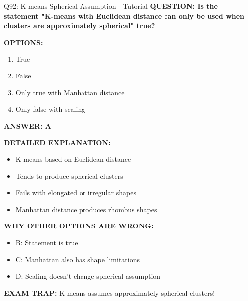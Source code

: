 \documentclass[8pt]{beamer}
\begin{document}
	\begin{frame}{Q92: K-means Spherical Assumption - Tutorial}
		\fontsize{6.5}{7.5}\selectfont
		\textbf{QUESTION: Is the statement "K-means with Euclidean distance can only be used when clusters are approximately spherical" true?}
		
		\vspace{0.1cm}
		\textbf{OPTIONS:}
		\begin{enumerate}
			\item True
			\item False
			\item Only true with Manhattan distance
			\item Only false with scaling
		\end{enumerate}
		
		\vspace{0.1cm}
		\textcolor{myblue}{\textbf{ANSWER: A}}
		
		\vspace{0.1cm}
		\textbf{DETAILED EXPLANATION:}
		\begin{itemize}
			\item K-means based on Euclidean distance
			\item Tends to produce spherical clusters
			\item Fails with elongated or irregular shapes
			\item Manhattan distance produces rhombus shapes
		\end{itemize}
		
		\vspace{0.1cm}
		\textcolor{myred}{\textbf{WHY OTHER OPTIONS ARE WRONG:}}
		\begin{itemize}
			\item \textcolor{myred}{B:} Statement is true
			\item \textcolor{myred}{C:} Manhattan also has shape limitations
			\item \textcolor{myred}{D:} Scaling doesn't change spherical assumption
		\end{itemize}
		
		\textcolor{myred}{\textbf{EXAM TRAP:}} K-means assumes \textcolor{myblue}{approximately spherical clusters}!
	\end{frame}
	
\end{document}
